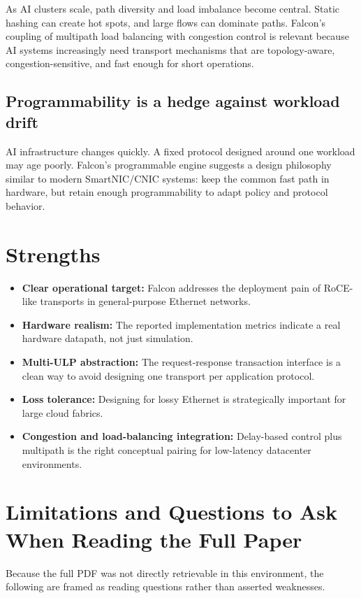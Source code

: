 \documentclass[11pt]{article}
\begin{document}
As AI clusters scale, path diversity and load imbalance become central. Static hashing can create hot spots, and large flows can dominate paths. Falcon's coupling of multipath load balancing with congestion control is relevant because AI systems increasingly need transport mechanisms that are topology-aware, congestion-sensitive, and fast enough for short operations.

\subsection{Programmability is a hedge against workload drift}

AI infrastructure changes quickly. A fixed protocol designed around one workload may age poorly. Falcon's programmable engine suggests a design philosophy similar to modern SmartNIC/CNIC systems: keep the common fast path in hardware, but retain enough programmability to adapt policy and protocol behavior.

\section{Strengths}

\begin{itemize}
  \item \textbf{Clear operational target:} Falcon addresses the deployment pain of RoCE-like transports in general-purpose Ethernet networks.
  \item \textbf{Hardware realism:} The reported implementation metrics indicate a real hardware datapath, not just simulation.
  \item \textbf{Multi-ULP abstraction:} The request-response transaction interface is a clean way to avoid designing one transport per application protocol.
  \item \textbf{Loss tolerance:} Designing for lossy Ethernet is strategically important for large cloud fabrics.
  \item \textbf{Congestion and load-balancing integration:} Delay-based control plus multipath is the right conceptual pairing for low-latency datacenter environments.
\end{itemize}

\section{Limitations and Questions to Ask When Reading the Full Paper}

Because the full PDF was not directly retrievable in this environment, the following are framed as reading questions rather than asserted weaknesses.
\end{document}
